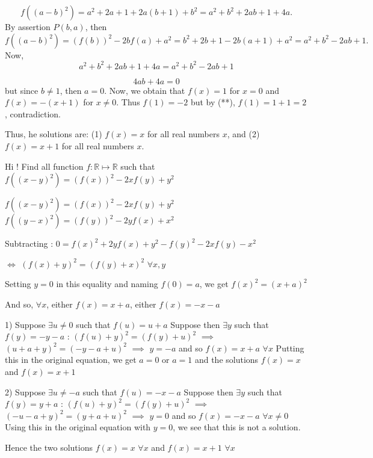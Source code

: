 \begin{solution}
\[ f((a - b)^2) = a^2 + 2a + 1 + 2a(b + 1) + b^2 = a^2 + b^2 + 2ab + 1 + 4a.\]
By assertion $ P(b,a)$, then
\[ f((a - b)^2) = (f(b))^2 - 2bf(a) + a^2 = b^2 + 2b + 1 - 2b(a + 1) + a^2 = a^2 + b^2 - 2ab + 1.\]
Now,
\[ a^2 + b^2 + 2ab + 1 + 4a = a^2 + b^2 - 2ab + 1\]

\[ 4ab + 4a = 0\]
but since $ b \ne 1$, then $ a = 0$.
Now, we obtain that $ f(x) = 1$ for $ x = 0$ and $ f(x) = - (x + 1)$ for $ x \ne 0$. Thus $ f(1) = - 2$ but by (**), $ f(1) = 1 + 1 = 2$, contradiction.

Thus, he solutions are: (1) $ f(x)=x$ for all real numbers $ x$, and (2) $ f(x)=x+1$ for all real numbers $ x$.
\end{solution}



\begin{solution}
	\begin{tcolorbox}Hi ! Find all function $ f : \mathbb{R}\mapsto\mathbb{R}$ such that $ f((x - y)^2) = (f(x))^2 - 2xf(y) + y^2$\end{tcolorbox}

$ f((x - y)^2) = (f(x))^2 - 2xf(y) + y^2$
$ f((y - x)^2) = (f(y))^2 - 2yf(x) + x^2$

Subtracting : $ 0=f(x)^2+2yf(x)+y^2-f(y)^2-2xf(y)-x^2$

$ \iff$ $ (f(x)+y)^2=(f(y)+x)^2$ $ \forall x,y$

Setting $ y=0$ in this equality and naming $ f(0)=a$, we get $ f(x)^2=(x+a)^2$

And so, $ \forall x$, either $ f(x)=x+a$, either $ f(x)=-x-a$

1) Suppose $ \exists u\ne 0$ such that $ f(u)=u+a$
Suppose then $ \exists y$ such that $ f(y)=-y-a$ :
$ (f(u)+y)^2=(f(y)+u)^2$ $ \implies$ $ (u+a+y)^2=(-y-a+u)^2$ $ \implies$ $ y=-a$ and so $ f(x)=x+a$ $ \forall x$
Putting this in the original equation, we get $ a=0$ or $ a=1$ and the solutions $ f(x)=x$ and $ f(x)=x+1$

2) Suppose $ \exists u\ne -a$ such that $ f(u)=-x-a$
Suppose then $ \exists y$ such that $ f(y)=y+a$ :
$ (f(u)+y)^2=(f(y)+u)^2$ $ \implies$ $ (-u-a+y)^2=(y+a+u)^2$ $ \implies$ $ y=0$ and so $ f(x)=-x-a$ $ \forall x\ne 0$
Using this in the original equation with $ y=0$, we see that this is not a solution.


Hence the two solutions $ \boxed{f(x)=x}$ $ \forall x$ and $ \boxed{f(x)=x+1}$ $ \forall x$
\end{solution}



